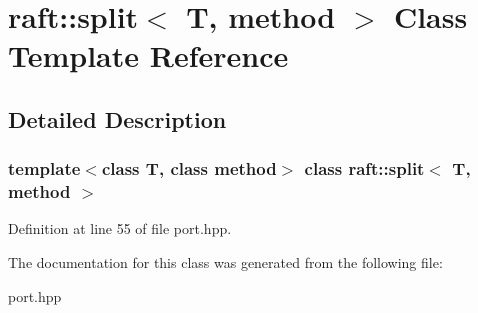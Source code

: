 \hypertarget{classraft_1_1split}{}\section{raft\+:\+:split$<$ T, method $>$ Class Template Reference}
\label{classraft_1_1split}


\subsection{Detailed Description}
\subsubsection*{template$<$class T, class method$>$\newline
class raft\+::split$<$ T, method $>$}



Definition at line 55 of file port.\+hpp.



The documentation for this class was generated from the following file\+:\begin{DoxyCompactItemize}
\item 
port.\+hpp\end{DoxyCompactItemize}
